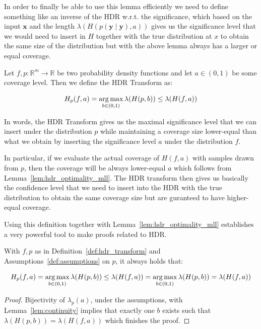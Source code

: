In order to finally be able to use this lemma efficiently we need to define something like an inverse of the HDR w.r.t. the significance, which based on the input $\mathbf{x}$ and the length $\lambda(H(p(\mathbf{y} \mid \mathbf{y}), a))$ gives us the significance level that we would need to insert in $H$ together with the true distribution at $x$ to obtain the same size of the distribution but with the above lemma always has a larger or equal coverage.

\begin{definition}\label{def:hdr_transform}
    Let $f,p : \mathbb{R}^m \to \mathbb{R}$ be two probability density functions and let $a \in (0,1)$ be some coverage level. Then we define the HDR Transform as:

    \[
        H_p(f, a) = \operatorname*{arg\,max}_{b \in (0,1)} \lambda(H(p, b)) \leq \lambda(H(f, a))
    \]

\end{definition}
In words, the HDR Transform gives us the maximal significance level that we can insert under the distribution $p$ while maintaining a coverage size lower-equal than what we obtain by inserting the significance level $a$ under the distribution $f$.

In particular, if we evaluate the actual coverage of $H(f, a)$ with samples drawn from $p$, then the coverage will be always lower-equal $a$ which follows from Lemma~\ref{lem:hdr_optimality_mll}. The HDR transform then gives us basically the confidence level that we need to insert into the HDR with the true distribution to obtain the same coverage size but are guranteed to have higher-equal coverage.

Using this definition together with Lemma~\ref{lem:hdr_optimality_mll} establishes a very powerful tool to make proofs related to HDR.

\begin{lemma}\label{lem:hdr_optimality}
    With $f,p$ as in Definition~\ref{def:hdr_transform} and Assumptions~\ref{def:assumptions} on $p$, it always holds that:

    \begin{equation}
        H_p(f, a) = \operatorname*{arg\,max}_{b \in (0,1)} \lambda(H(p, b)) \leq \lambda(H(f, a)) = \operatorname*{arg\,max}_{b \in (0,1)} \lambda(H(p, b)) = \lambda(H(f, a))
    \end{equation}
\end{lemma}
\begin{proof}
    Bijectivity of $\lambda_p(a)$, under the assumptions, with Lemma~\ref{lem:continuity} implies that exactly one $b$ exists such that $\lambda(H(p, b)) = \lambda(H(f, a))$ which finishes the proof.
\end{proof}


